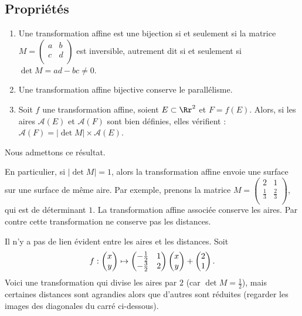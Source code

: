 \documentclass[11pt,class=report,crop=false]{standalone}
\begin{document}


\subsection{Propriétés}

\begin{proposition}
\sauteligne
\begin{enumerate}
  \item Une transformation affine est une bijection si et seulement si 
la matrice $M=\left(\begin{smallmatrix} a & b \\ c & d \\ 
                   \end{smallmatrix} \right)$ est inversible, autrement dit 
si et seulement si $\det M = ad-bc \neq 0$.
  
  \item Une transformation affine bijective conserve le parallélisme.

  \item Soit $f$ une transformation affine, soient $E \subset \Rr^2$ et $F= f(E)$. 
  Alors, si les aires $\mathcal{A}(E)$ et $\mathcal{A}(F)$ sont bien définies, elles vérifient :
$\mathcal{A}(F) = |\det M| \times \mathcal{A}(E)$.
\end{enumerate}
\end{proposition}

Nous admettons ce résultat.



\begin{remarque*}
En particulier, si $|\det M| = 1$, alors la transformation affine envoie une 
surface sur une surface de même aire.
Par exemple, prenons la matrice $M = \begin{pmatrix} 2 & 1 \\ \frac 13 & \frac 23 \\ \end{pmatrix}$,
qui est de déterminant $1$.
La transformation affine associée conserve les aires.
Par contre cette transformation ne conserve pas les distances.


Il n'y a pas de lien évident entre les aires et les distances. Soit
$$f : \begin{pmatrix}x \\ y\end{pmatrix} \mapsto  \begin{pmatrix} -\frac 12 & 1 \\ -\frac 32 & 2 \\ \end{pmatrix}\begin{pmatrix}x \\ y\end{pmatrix}
+\begin{pmatrix}2 \\ 1\end{pmatrix}.$$
Voici une transformation qui divise les aires par $2$ (car $\det M = \frac 12$),
mais certaines distances sont agrandies alors que d'autres sont réduites 
(regarder les images des diagonales du carré ci-dessous).

\end{remarque*}
\end{document}
